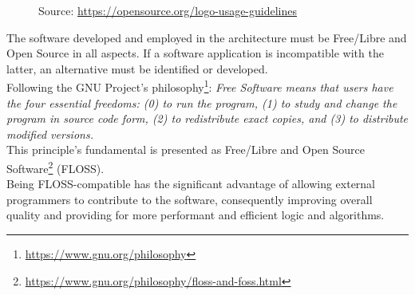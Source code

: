 \begin{figure} %
  \centering
  \def\stackalignment{r} %
  {\scriptsize \parbox[t]{\linewidth}{ Source: \url{https://opensource.org/logo-usage-guidelines}} }
\end{figure}

The software developed and employed in the architecture must be Free/Libre and Open
Source in all aspects. If a software application is incompatible with the latter,
an alternative must be identified or developed. \\ %
Following the GNU Project's philosophy\footnote{\url{https://www.gnu.org/philosophy}}:
\textit{Free Software means that users have the four essential freedoms: (0) to run
the program, (1) to study and change the program in source code form, (2) to redistribute
exact copies, and (3) to distribute modified versions.} \\ %
This principle's fundamental is presented as Free/Libre and Open Source Software\footnote{\url{https://www.gnu.org/philosophy/floss-and-foss.html}}
(FLOSS). \\ %
Being FLOSS-compatible has the significant advantage of allowing external programmers
to contribute to the software, consequently improving overall quality and
providing for more performant and efficient logic and algorithms.


